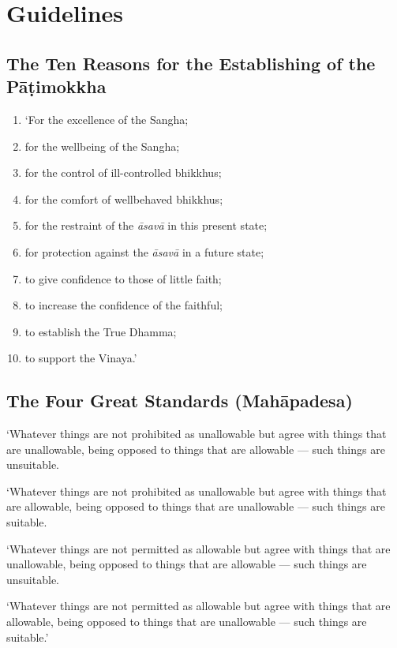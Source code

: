 \chapter{Guidelines}

\section{The Ten Reasons for the Establishing of the Pāṭimokkha}

\begin{enumerate}

\item `For the excellence of the Sangha;
\item for the wellbeing of the Sangha;
\item for the control of ill-controlled bhikkhus;
\item for the comfort of wellbehaved bhikkhus;
\item for the restraint of the \emph{āsavā} in this present state;
\item for protection against the \emph{āsavā} in a future state;
\item to give confidence to those of little faith;
\item to increase the confidence of the faithful;
\item to establish the True Dhamma;
\item to support the Vinaya.'

\end{enumerate}


\section{The Four Great Standards (Mahāpadesa)}

`Whatever things are not prohibited as unallowable but agree with things that
are unallowable, being opposed to things that are allowable — such things are
unsuitable.

`Whatever things are not prohibited as unallowable but agree with things that
are allowable, being opposed to things that are unallowable — such things are
suitable.

`Whatever things are not permitted as allowable but agree with things that are
unallowable, being opposed to things that are allowable — such things are
unsuitable.

`Whatever things are not permitted as allowable but agree with things that are
allowable, being opposed to things that are unallowable — such things are
suitable.'

